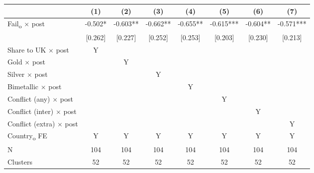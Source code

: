 {
\def\sym#1{\ifmmode^{#1}\else\(^{#1}\)\fi}
\begin{tabular}{l*{7}{c}}
\toprule
            &\multicolumn{1}{c}{(1)}   &\multicolumn{1}{c}{(2)}   &\multicolumn{1}{c}{(3)}   &\multicolumn{1}{c}{(4)}   &\multicolumn{1}{c}{(5)}   &\multicolumn{1}{c}{(6)}   &\multicolumn{1}{c}{(7)}   \\
\midrule
Fail\textsubscript{o} $\times$ post&      -0.502*  &      -0.603** &      -0.662** &      -0.655** &      -0.615***&      -0.604** &      -0.571***\\
            &     [0.262]   &     [0.227]   &     [0.252]   &     [0.253]   &     [0.203]   &     [0.230]   &     [0.213]   \\
Share to UK $\times$ post &           Y   &               &               &               &               &               &               \\
Gold $\times$ post &               &           Y   &               &               &               &               &               \\
Silver $\times$ post &               &               &           Y   &               &               &               &               \\
Bimetallic $\times$ post &               &               &               &           Y   &               &               &               \\
Conflict (any) $\times$ post &               &               &               &               &           Y   &               &               \\
Conflict (inter) $\times$ post &               &               &               &               &               &           Y   &               \\
Conflict (extra) $\times$ post &               &               &               &               &               &               &           Y   \\
Country\textsubscript{o} FE&           Y   &           Y   &           Y   &           Y   &           Y   &           Y   &           Y   \\
\midrule
N           &         104   &         104   &         104   &         104   &         104   &         104   &         104   \\
Clusters    &          52   &          52   &          52   &          52   &          52   &          52   &          52   \\
\bottomrule
\end{tabular}
}
